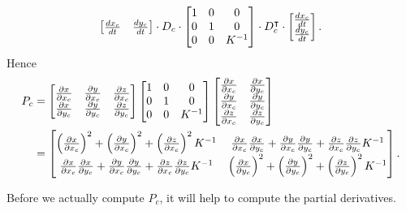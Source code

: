 \documentclass{ximera}
\begin{document}
\begin{problem}
\begin{freeResponse}
\begin{align*}
\begin{bmatrix}
      \frac{dx_c}{dt} & \frac{dy_c}{dt}
    \end{bmatrix}\cdot D_{c}\cdot
    \begin{bmatrix}
      1 & 0 & 0\\
      0 & 1 & 0\\
    0 & 0 & K^{-1}
    \end{bmatrix}
    \cdot
    D_{c}^\transpose
    \cdot \begin{bmatrix}
      \frac{dx_c}{dt} \\ \frac{dy_c}{dt}
    \end{bmatrix}.
  \end{align*}
    Hence
    \begin{align*}
      P_c &=
      \begin{bmatrix}
        \pp[x]{x_c} & \pp[y]{x_c} & \pp[z]{x_c} \\
        \pp[x]{y_c} & \pp[y]{y_c} & \pp[z]{y_c}
      \end{bmatrix}
      \begin{bmatrix}
        1 & 0 & 0\\
        0 & 1 & 0\\
        0 & 0 & K^{-1}
      \end{bmatrix}
      \begin{bmatrix}
        \pp[x]{x_c} & \pp[x]{y_c}\\ 
        \pp[y]{x_c} & \pp[y]{y_c}\\
        \pp[z]{x_c} & \pp[z]{y_c}
      \end{bmatrix}\\
      &=
      \begin{bmatrix}
        \left(\pp[x]{x_c}\right)^2 + \left(\pp[y]{x_c}\right)^2 + \left(\pp[z]{x_c}\right)^2K^{-1} & \pp[x]{x_c}\pp[x]{y_c} + \pp[y]{x_c}\pp[y]{y_c} + \pp[z]{x_c}\pp[z]{y_c} K^{-1}\\
        \pp[x]{x_c}\pp[x]{y_c} + \pp[y]{x_c}\pp[y]{y_c} + \pp[z]{x_c}\pp[z]{y_c} K^{-1}       & \left(\pp[x]{y_c}\right)^2 + \left(\pp[y]{y_c}\right)^2 + \left(\pp[z]{y_c}\right)^2K^{-1}
      \end{bmatrix}.
    \end{align*}
  \end{freeResponse}
\end{problem}

Before we actually compute $P_c$, it will help to compute the partial
derivatives.
\end{document}

